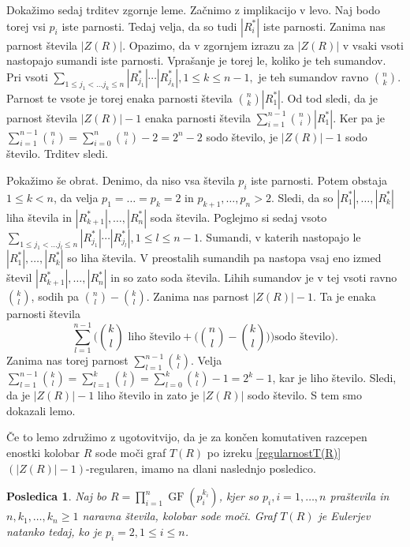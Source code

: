 \documentclass[a4paper, 12pt]{amsart}
\theoremstyle{definition} %
\theoremstyle{plain} %
\newtheorem{posledica}[definicija]{Posledica}
\DeclareMathOperator{\GF}{GF}
\begin{document}
Dokažimo sedaj trditev zgornje leme. Začnimo z implikacijo v levo. Naj bodo torej vsi $p_i$ iste parnosti. Tedaj velja, da so tudi $|R_i^*|$ iste parnosti. Zanima nas parnost števila $|Z(R)|$. Opazimo, da v zgornjem izrazu za $|Z(R)|$ v vsaki vsoti nastopajo sumandi iste parnosti. Vprašanje je torej le, koliko je teh sumandov. Pri vsoti $\sum_{1\le j_1 < \dots j_k \le n}|R_{j_1}^*| \cdots |R_{j_k}^*|, 1 \le k \le n-1,$ je teh sumandov ravno ${n \choose k}$. Parnost te vsote je torej enaka parnosti števila ${n \choose k} |R_1^*|$. Od tod sledi, da je parnost števila $|Z(R)| -1$ enaka parnosti števila $\sum_{i=1}^{n-1} {n \choose i} |R_1^*|$. Ker pa je $\sum_{i=1}^{n-1} {n \choose i} = \sum_{i=0}^{n} {n \choose i} - 2 = 2^n - 2 $ sodo število, je $|Z(R)| -1$ sodo število. Trditev sledi.

Pokažimo še obrat. Denimo, da niso vsa števila $p_i$ iste parnosti. Potem obstaja $1\le k <n$, da velja $p_1 = \dots=p_k =2$ in $p_{k+1},\dots,p_n >2$. Sledi, da so $|R_1^*|,\dots,|R_k^*|$ liha števila in $|R_{k+1}^*|, \dots, |R_n^*|$ soda števila.
Poglejmo si sedaj vsoto  $\sum_{1\le j_1 < \dots j_l \le n}|R_{j_1}^*| \cdots |R_{j_l}^*|, 1 \le l \le n-1$. Sumandi, v katerih nastopajo le $|R_1^*|,\dots,|R_k^*|$ so liha števila. V preostalih sumandih pa nastopa vsaj eno izmed števil $|R_{k+1}^*|,\dots,|R_n^*|$ in so zato soda števila. Lihih sumandov je v tej vsoti ravno ${k \choose l}$, sodih pa ${n \choose l} - {k \choose l}$. Zanima nas parnost $|Z(R)|-1$. Ta je enaka parnosti števila
$$
\sum_{l=1}^{n-1} \Big( {k \choose l} \text{ liho število} +\big ({n \choose l} - {k \choose l})\big) \text{sodo število}\Big).
$$
Zanima nas torej parnost $\sum_{l=1}^{n-1}  {k \choose l} $. Velja $\sum_{l=1}^{n-1}{ k\choose l} = \sum_{l=1}^k {k \choose l} = \sum_{l=0}^k {k \choose l} - 1 = 2^k -1$, kar je liho število. Sledi, da je $|Z(R)| -1$ liho število in zato je $|Z(R)| $ sodo število. S tem smo dokazali lemo.
\endproof

Če to lemo združimo z ugotovitvijo, da je za končen komutativen razcepen enostki kolobar $R$ sode moči graf $T(R)$ po izreku \ref{regularnostT(R)} $( |Z(R)| -1)$-regularen, imamo na dlani naslednjo posledico.

\begin{posledica}
Naj bo $R=\prod_{i=1}^n \GF(p_i^{k_i})$, kjer so $p_i,i=1,\dots,n$ praštevila in $n, k_1,\dots,k_n\ge 1$ naravna števila, kolobar sode moči. Graf $T(R)$ je Eulerjev natanko tedaj, ko je $p_i=2, 1\le i\le n$. 
\end{posledica}
\end{document}
